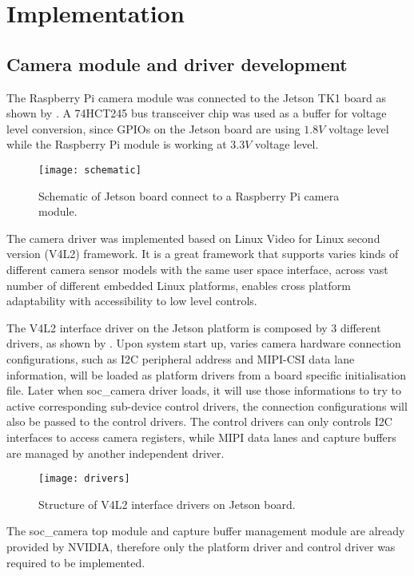 \chapter{Implementation}

\section{Camera module and driver development}

The Raspberry Pi camera module was connected to the Jetson TK1 board as shown by . A 74HCT245 bus transceiver chip was used as a buffer for voltage level conversion, since GPIOs on the Jetson board are using $1.8V$ voltage level while the Raspberry Pi module is working at $3.3V$ voltage level.

\begin{figure}[H]
  \centering
  \texttt{[image: schematic]}
  \caption{Schematic of Jetson board connect to a Raspberry Pi camera module.}
  \label{imp:schematic}
\end{figure}

The camera driver was implemented based on Linux Video for Linux second version (V4L2) framework. It is a great framework that supports varies kinds of different camera sensor models with the same user space interface, across vast number of different embedded Linux platforms, enables cross platform adaptability with accessibility to low level controls.

The V4L2 interface driver on the Jetson platform is composed by 3 different drivers, as shown by . Upon system start up, varies camera hardware connection configurations, such as I2C peripheral address and MIPI-CSI data lane information, will be loaded as platform drivers from a board specific initialisation file. Later when soc\_camera driver loads, it will use those informations to try to active corresponding sub-device control drivers, the connection configurations will also be passed to the control drivers. The control drivers can only controls I2C interfaces to access camera registers, while MIPI data lanes and capture buffers are managed by another independent driver.

\begin{figure}[H]
  \centering
  \texttt{[image: drivers]}
  \caption{Structure of V4L2 interface drivers on Jetson board.}
  \label{imp:drivers}
\end{figure}

The soc\_camera top module and capture buffer management module are already provided by NVIDIA, therefore only the platform driver and control driver was required to be implemented.

